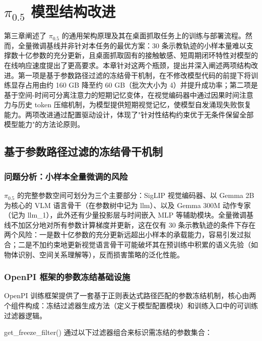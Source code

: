 
\chapter{$\pi_{0.5}$ 模型结构改进}
\label{chap:model-improvements}

第三章阐述了 $\pi_{0.5}$ 的通用架构原理及其在桌面抓取任务上的训练与部署流程。然而，全量微调基线并非针对本任务的最优方案：30 条示教轨迹的小样本量难以支撑数十亿参数的充分更新，且桌面抓取固有的接触敏感、短周期闭环特性对模型的在线响应速度提出了更高要求。本章针对这两个瓶颈，提出并深入阐述两项结构改进。第一项是基于参数路径过滤的冻结骨干机制，在不修改模型代码的前提下将训练显存占用由约 160 GB 降至约 60 GB（批次大小为 4）并提升成功率；第二项是基于空间-时间可分离注意力的短期记忆变体，在视觉编码器中通过因果时间注意力与历史 token 压缩机制，为模型提供短期视觉记忆，使模型自发涌现失败恢复能力。两项改进通过配置驱动设计，体现了"针对性结构约束优于无条件保留全部模型能力"的方法论原则。

\section{基于参数路径过滤的冻结骨干机制}
\label{sec:freeze-backbone}

\subsection{问题分析：小样本全量微调的风险}

$\pi_{0.5}$ 的完整参数空间可划分为三个主要部分：SigLIP 视觉编码器、以 Gemma 2B 为核心的 VLM 语言骨干（在参数树中记为 llm）、以及 Gemma 300M 动作专家（记为 llm\_1），此外还有少量投影层与时间嵌入 MLP 等辅助模块。全量微调基线不加区分地对所有参数计算梯度并更新，这在仅有 30 条示教轨迹的条件下存在两个风险：一是数十亿参数的充分更新远超出小样本的承载能力，容易引发过拟合；二是不加约束地更新视觉语言骨干可能破坏其在预训练中积累的语义先验（如物体识别、空间关系理解等），反而损害策略的泛化性能。

\subsection{OpenPI 框架的参数冻结基础设施}

OpenPI 训练框架提供了一套基于正则表达式路径匹配的参数冻结机制，核心由两个组件构成：冻结过滤器生成方法（定义于模型配置模块）和训练入口中的可训练过滤器逻辑。

get\_freeze\_filter() 通过以下过滤器组合来标识需冻结的参数集合：

